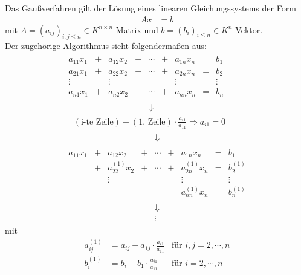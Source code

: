  \label{2.1.1}
Das Gaußverfahren gilt der Lösung eines linearen Gleichungssystems der Form
\begin{align*}
  Ax &= b
\end{align*}
mit $A=(a_{ij})_{i,j \leq n} \in K^{n\times n}$ Matrix und $b=(b_i)_{i\leq n} \in K^n$ Vektor.\\
Der zugehörige Algorithmus sieht folgendermaßen aus:
\begin{gather*}
  \begin{array}{ccccccccc}
    a_{11}x_1 &+& a_{12}x_2 &+& \cdots &+& a_{1n}x_n & = & b_1 ~~\\
    a_{21}x_1 &+& a_{22}x_2 &+& \cdots &+& a_{2n}x_n & = & b_2 \\
    \vdots         &&        \vdots     &&              &&   \vdots       &    & \vdots \\
    a_{n1}x_1 &+& a_{n2}x_2 &+& \cdots &+& a_{nn}x_n & = & b_n \\\\
              &&&& \Downarrow &&&& 
  \end{array} \\
  \quad	(\text{i-te Zeile}) - (\text{1. Zeile})\cdot \frac{a_{i1}}{a_{11}} \Rightarrow a_{i1}=0\\
  \begin{array}{ccccccccc}
    &&&& \Downarrow &&&&  \\\\
    a_{11}x_1 &+& a_{12}x_2 &+& \cdots &+& a_{1n}x_n & = & b_1 \\
    &+& a_{22}^{(1)}x_2 &+& \cdots &+& a_{2n}^{(1)}x_n & = & b_2^{(1)} \\
    &&        \vdots     &&              &&   \vdots       &    & \vdots \\
    && && && a_{nn}^{(1)}x_n & = & b_n^{(1)} \\\\
    &&&& \Downarrow &&&&\\
    &&&& \vdots &&&&
  \end{array} 
\end{gather*}
mit
\begin{align*}
  a_{ij}^{(1)} &= a_{ij}-a_{1j}\cdot \frac{a_{i1}}{a_{11}}
  & \text{für }i,j = 2, \cdots, n \\
  b_i^{(1)}      &= b_i- b_1\cdot \frac{a_{i1}}{a_{11}}
  & \text{für }i = 2, \cdots, n 
\end{align*}


